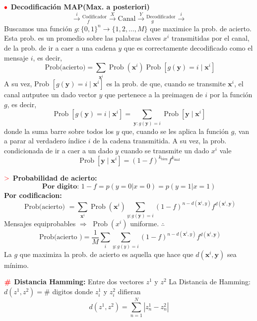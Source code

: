 \documentclass[%
 reprint,
 amsmath,amssymb,
 aps,
]{revtex4-1}
\begin{document}
\textbf{$\color{red}{\bullet}$ Decodificación MAP(Max. a posteriori)}
$$
\stackrel{i}{\rightarrow}
\boxed{^\text{Codificador}_{\quad f}} \stackrel{X}{\rightarrow}
\boxed{\text{Canal}} \stackrel{Y}{\rightarrow}
\boxed{^\text{Decodificador} _{\quad g}} \stackrel{i}{\rightarrow}$$
Buscamos una función $g:\{0,1\}^{n} \rightarrow\{1,2, \ldots, M\}$ que maximice la prob. de acierto. Esta prob. es un promedio sobre las palabras claves $x^{i}$ transmitidas por el canal, de la prob. de ir a caer a una cadena $y$ que es correctamente decodificado
como el mensaje $i$, es decir,
$$
\text { Prob(acierto})=\sum_{\boldsymbol{x}^{\mathrm{i}}} \operatorname{Prob}\left(\boldsymbol{x}^{i}\right) \operatorname{Prob}\left[g(\boldsymbol{y})=i \mid \boldsymbol{x}^{i}\right]
$$
A su vez, Prob $\left[g(\boldsymbol{y})=i \mid \boldsymbol{x}^{i}\right]$ es la prob. de que, cuando se transmite $\boldsymbol{x}^{i}$, el canal autputee un dado vector $y$ que pertenece a la preimagen de $i$ por la función $g$, es decir,
$$
\operatorname{Prob}\left[g(\boldsymbol{y})=i \mid \boldsymbol{x}^{i}\right]=\sum_{\boldsymbol{y} : g(\boldsymbol{y})=i} \operatorname{Prob}\left[\boldsymbol{y} \mid \boldsymbol{x}^{i}\right]
$$
donde la suma barre sobre todos los $y$ que, cuando se les aplica la función $g$, van a parar al verdadero índice $i$ de la cadena transmitida. A su vez, la prob. condicionada de ir a caer a un dado $y$ cuando se transmite un dado $x^{i}$ vale
$$
\operatorname{Prob}\left[\boldsymbol{y} \mid \boldsymbol{x}^{i}\right]=(1-f)^{k_{\text {bien}}} f^{k_{\operatorname{mal}}}
$$

\textbf{$\textcolor{red}{\mathbf{>}}$ Probabilidad de acierto:}
$$\textbf{Por digito: }1-f = p(y=0|x=0)=p(y=1|x=1)$$
\textbf{Por codificacion:}
$$
\text { Prob(acierto) }=\sum_{\boldsymbol{x}^{i}} \operatorname{Prob}\left(\boldsymbol{x}^{i}\right) \sum_{y : g(\boldsymbol{y})=i}(1-f)^{n-d\left(\boldsymbol{x}^{i}, y\right)} f^{d\left(\boldsymbol{x}^{i}, \boldsymbol{y}\right)}
$$
Mensajes equiprobables $\Rightarrow$ $\operatorname{Prob}\left(x^{i}\right)$ uniforme. $\boldsymbol{\therefore}$
$$
\text { Prob(acierto })=\frac{1}{M} \sum_{i} \sum_{y : g(y)=i}(1-f)^{n-d\left(\boldsymbol{x}^{i}, y\right)} f^{d\left(\boldsymbol{x}^{i}, \boldsymbol{y}\right)}
$$
La $g$ que maximiza la prob. de acierto es aquella que hace que 
$d\left(\boldsymbol{x}^{i}, \boldsymbol{y}\right)$ sea mínimo.

\textbf{$\color{red}{\textbf{\#}}$ Distancia Hamming:} 
Entre dos vectores $z^{1}$ y $z^{2}$ 
La Distancia de Hamming: 
$d\left(z^{1}, z^{2}\right) = \#$ digitos donde $z^{1}_i$ y $z^{2}_i$ difieran
$$
d(z^{1}, z^{2})=\sum_{n=1}^{N}\left|z^{1}_{n}-z^{2}_{n}\right|
$$
\end{document}
